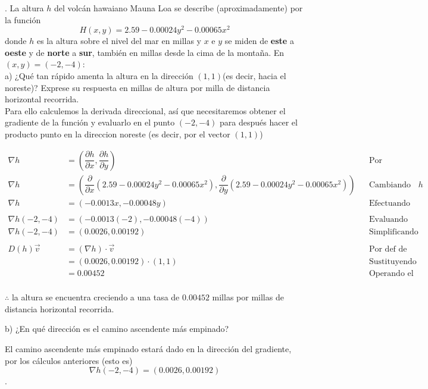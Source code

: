\documentclass[letterpaper]{article}
\renewcommand{\d}{\partial}
\renewcommand{\*}{\cdot}
\theoremstyle{definition}
\begin{document}
. La altura $ h $ del volcán hawaiano Mauna Loa se describe (aproximadamente) por la función $$ H(x,y) = 2.59 - 0.00024y^2 - 0.00065x^2 $$donde $ h $ es la altura sobre el nivel del mar en millas y $ x $ e $ y $ se miden de \textbf{este} a \textbf{oeste} y de \textbf{norte} a \textbf{sur}, también en millas desde la cima de la montaña. En $ (x,y) = (-2,-4) $:\\

a) ¿Qué tan rápido amenta la altura en la dirección $ (1,1) $(es decir, hacia el noreste)? Exprese su respuesta en millas de altura por milla de distancia horizontal recorrida.\\

Para ello calculemos la derivada direccional, así que necesitaremos obtener el gradiente de la función y evaluarlo en el punto $ (-2,-4) $ para después hacer el producto punto en la direccion noreste (es decir, por el vector $ (1,1) $)

\begin{align*}
	\nabla h &= \left(\dfrac{\d h}{\d x}, \dfrac{\d h}{\d y}\right) &&\text{Por definición de gradiente}\\
	\nabla h &= \left(\dfrac{\d }{\d x}(2.59 - 0.00024y^2 - 0.00065x^2), \dfrac{\d}{\d y}(2.59 - 0.00024y^2 - 0.00065x^2)\right) &&\text{Cambiando por la definición de }h\\
	\nabla h &= \left(-0.0013x, -0.00048y\right) &&\text{Efectuando las parciales}\\
	\\
	\nabla h(-2,-4) &= \left(-0.0013(-2), -0.00048(-4)\right) &&\text{Evaluando en el punto en cuestión}\\
	\nabla h(-2,-4) &= (0.0026, 0.00192) &&\text{Simplificando}\\
	\\
	D(h) \vec{v} &= (\nabla h)\* \vec{v} &&\text{Por def de derivada direccional}\\
	 &= (0.0026, 0.00192)\* (1,1) &&\text{Sustituyendo el vector en cuestión}\\
	 &=0.00452&&\text{Operando el producto punto}\\
\end{align*}
\begin{center}
	$ \therefore $ la altura se encuentra creciendo a una tasa de $ 0.00452 $ millas por millas de distancia horizontal recorrida.
\end{center}

b) ¿En qué dirección es el camino ascendente más empinado?

El camino ascendente más empinado estará dado en la dirección del gradiente, por los cálculos anteriores (esto es) $$\nabla h(-2,-4)= (0.0026,0.00192) $$.
\end{document}
